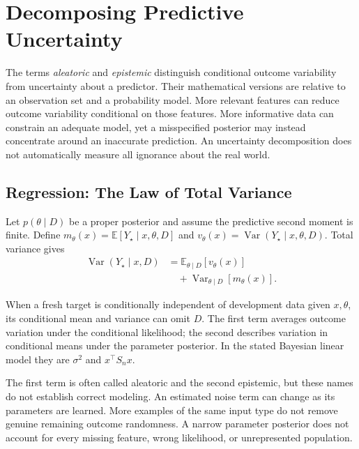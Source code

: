 \section{Decomposing Predictive Uncertainty}
\label{sec:uncertainty}

The terms \emph{aleatoric} and \emph{epistemic} distinguish conditional outcome variability from uncertainty about a predictor. Their mathematical versions are relative to an observation set and a probability model. More relevant features can reduce outcome variability conditional on those features. More informative data can constrain an adequate model, yet a misspecified posterior may instead concentrate around an inaccurate prediction. An uncertainty decomposition does not automatically measure all ignorance about the real world.

\par{}\noindent\begin{minipage}{\linewidth}
\subsection{Regression: The Law of Total Variance}

Let $p(\theta\mid D)$ be a proper posterior and assume the predictive second moment is finite. Define $m_\theta(x)=\mathbb E[Y_\star\mid x,\theta,D]$ and $v_\theta(x)=\operatorname{Var}(Y_\star\mid x,\theta,D)$. Total variance gives
\begin{align*}
\operatorname{Var}(Y_\star\mid x,D)
&=\mathbb E_{\theta\mid D}[v_\theta(x)]\\
&\quad+\operatorname{Var}_{\theta\mid D}[m_\theta(x)].
\end{align*}
\end{minipage}\par\addvspace{\belowdisplayskip}
When a fresh target is conditionally independent of development data given $x,\theta$, its conditional mean and variance can omit $D$. The first term averages outcome variation under the conditional likelihood; the second describes variation in conditional means under the parameter posterior. In the stated Bayesian linear model they are $\sigma^2$ and $x^\top S_nx$.

The first term is often called aleatoric and the second epistemic, but these names do not establish correct modeling. An estimated noise term can change as its parameters are learned. More examples of the same input type do not remove genuine remaining outcome randomness. A narrow parameter posterior does not account for every missing feature, wrong likelihood, or unrepresented population.

